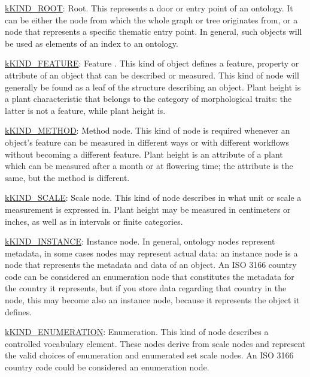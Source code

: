 \begin{DoxyItemize}
\item {\ttfamily \hyperlink{}{k\-K\-I\-N\-D\-\_\-\-R\-O\-O\-T}}\-: Root. This represents a door or entry point of an ontology. It can be either the node from which the whole graph or tree originates from, or a node that represents a specific thematic entry point. In general, such objects will be used as elements of an index to an ontology. 
\item {\ttfamily \hyperlink{}{k\-K\-I\-N\-D\-\_\-\-F\-E\-A\-T\-U\-R\-E}}\-: Feature . This kind of object defines a feature, property or attribute of an object that can be described or measured. This kind of node will generally be found as a leaf of the structure describing an object. Plant height is a plant characteristic that belongs to the category of morphological traits\-: the latter is not a feature, while plant height is. 
\item {\ttfamily \hyperlink{}{k\-K\-I\-N\-D\-\_\-\-M\-E\-T\-H\-O\-D}}\-: Method node. This kind of node is required whenever an object's feature can be measured in different ways or with different workflows without becoming a different feature. Plant height is an attribute of a plant which can be measured after a month or at flowering time; the attribute is the same, but the method is different. 
\item {\ttfamily \hyperlink{}{k\-K\-I\-N\-D\-\_\-\-S\-C\-A\-L\-E}}\-: Scale node. This kind of node describes in what unit or scale a measurement is expressed in. Plant height may be measured in centimeters or inches, as well as in intervals or finite categories. 
\item {\ttfamily \hyperlink{}{k\-K\-I\-N\-D\-\_\-\-I\-N\-S\-T\-A\-N\-C\-E}}\-: Instance node. In general, ontology nodes represent metadata, in some cases nodes may represent actual data\-: an instance node is a node that represents the metadata and data of an object. An I\-S\-O 3166 country code can be considered an enumeration node that constitutes the metadata for the country it represents, but if you store data regarding that country in the node, this may become also an instance node, because it represents the object it defines. 
\item {\ttfamily \hyperlink{}{k\-K\-I\-N\-D\-\_\-\-E\-N\-U\-M\-E\-R\-A\-T\-I\-O\-N}}\-: Enumeration. This kind of node describes a controlled vocabulary element. These nodes derive from scale nodes and represent the valid choices of enumeration and enumerated set scale nodes. An I\-S\-O 3166 country code could be considered an enumeration node. 

\end{DoxyItemize}

